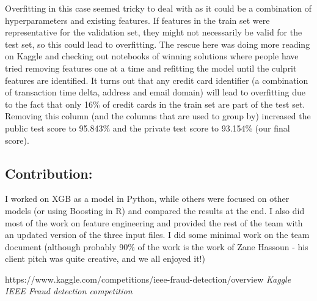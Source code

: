 \documentclass[11pt,a4paper]{article}
\begin{document}
Overfitting in this case seemed tricky to deal with as it could be a combination of hyperparameters and existing features. If features in the train set were representative for the validation set, they might not necessarily be valid for the test set, so this could lead to overfitting. The rescue here was doing more reading on Kaggle and checking out notebooks of winning solutions where people have tried removing features one at a time and refitting the model until the culprit features are identified. It turns out that any credit card identifier (a combination of transaction time delta, address and email domain) will lead to overfitting due to the fact that only 16\% of credit cards in the train set are part of the test set. Removing this column (and the columns that are used to group by) increased the public test score to 95.843\% and the private test score to 93.154\% (our final score).  

\subsection*{Contribution:} I worked on XGB as a model in Python, while others were focused on other models (or using Boosting in R) and compared the results at the end. I also did most of the work on feature engineering and provided the rest of the team with an updated version of the three input files. I did some minimal work on the team document (although probably 90\% of the work is the work of Zane Hassoun - his client pitch was quite creative, and we all enjoyed it!)



\newpage
\begin{thebibliography}{9}
        https://www.kaggle.com/competitions/ieee-fraud-detection/overview
        \emph{Kaggle IEEE Fraud detection competition}    
\end{thebibliography}
 
\end{document}
